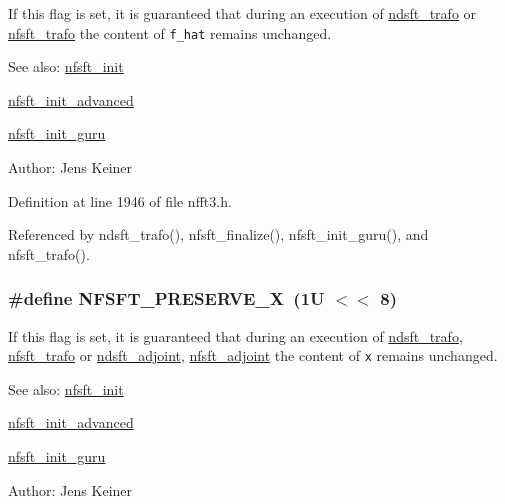If this flag is set, it is guaranteed that during an execution of \hyperlink{group__nfsft_gc1bcdf551a0bf1b4a5890b87e583caf8}{ndsft\_\-trafo} or \hyperlink{group__nfsft_g5796fc68c432d46dfcab7abd8c56ee22}{nfsft\_\-trafo} the content of {\tt f\_\-hat} remains unchanged. 

\begin{Desc}
\item[See also:]\hyperlink{group__nfsft_g65cda3f4a3edc5eb39c697cf34b1f0b9}{nfsft\_\-init} 

\hyperlink{group__nfsft_ge7dca3e41afdb39e8c518af414878c18}{nfsft\_\-init\_\-advanced} 

\hyperlink{group__nfsft_g60466ed37643b6b7b7c1638056604d2b}{nfsft\_\-init\_\-guru} \end{Desc}
\begin{Desc}
\item[Author:]Jens Keiner \end{Desc}


Definition at line 1946 of file nfft3.h.

Referenced by ndsft\_\-trafo(), nfsft\_\-finalize(), nfsft\_\-init\_\-guru(), and nfsft\_\-trafo().\hypertarget{group__nfsft_gcf7d73753b74dbf148167c3d46226f09}{
\subsubsection{\setlength{\rightskip}{0pt plus 5cm}\#define NFSFT\_\-PRESERVE\_\-X~(1U $<$$<$ 8)}}
\label{group__nfsft_gcf7d73753b74dbf148167c3d46226f09}


If this flag is set, it is guaranteed that during an execution of \hyperlink{group__nfsft_gc1bcdf551a0bf1b4a5890b87e583caf8}{ndsft\_\-trafo}, \hyperlink{group__nfsft_g5796fc68c432d46dfcab7abd8c56ee22}{nfsft\_\-trafo} or \hyperlink{group__nfsft_g88c7be3ead1c726a1d5b8b903952c527}{ndsft\_\-adjoint}, \hyperlink{group__nfsft_g813bb48d404c7286310733c99a81a169}{nfsft\_\-adjoint} the content of {\tt x} remains unchanged. 

\begin{Desc}
\item[See also:]\hyperlink{group__nfsft_g65cda3f4a3edc5eb39c697cf34b1f0b9}{nfsft\_\-init} 

\hyperlink{group__nfsft_ge7dca3e41afdb39e8c518af414878c18}{nfsft\_\-init\_\-advanced} 

\hyperlink{group__nfsft_g60466ed37643b6b7b7c1638056604d2b}{nfsft\_\-init\_\-guru} \end{Desc}
\begin{Desc}
\item[Author:]Jens Keiner \end{Desc}


